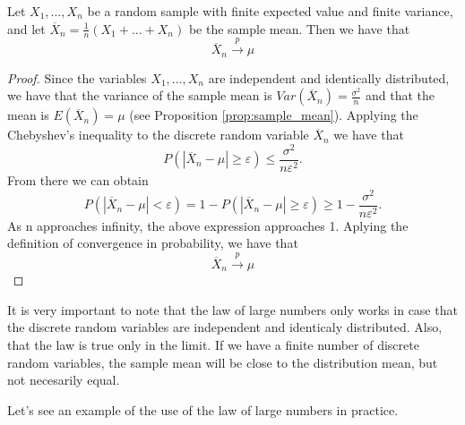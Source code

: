 \begin{theorem}
\label{th:law_large_numbers}
Let $X_1, \ldots, X_n$ be a random sample with finite expected value and finite variance, and let $\overline {X}_n = \frac {1}{n} \left( X_1 + \ldots + X_n \right)$ be the sample mean. Then we have that
\[
\overline {X}_n \overset{p}{\rightarrow} \mu
\]
\end{theorem}
\begin{proof}
Since the variables $X_1, \ldots, X_n$ are independent and identically distributed, we have that the variance of the sample mean is $Var \left( \overline {X}_n \right) = \frac{\sigma^2}{n}$ and that the mean is $E \left( \overline {X}_n \right) = \mu$ (see Proposition \ref{prop:sample_mean}). Applying the Chebyshev's inequality to the discrete random variable $\overline {X}_n$ we have that
\[
P \left( \left| \overline {X}_n- \mu \right| \geq \varepsilon \right) \leq \frac{\sigma ^2}{n \varepsilon^2}.
\]
From there we can obtain
\[
P \left( \left| \overline {X}_n - \mu \right| < \varepsilon \right) = 1 - P \left( \left| \overline {X}_n - \mu \right| \geq \varepsilon \right) \geq 1 - \frac{\sigma ^2}{n \varepsilon^2}.
\]
As n approaches infinity, the above expression approaches 1. Aplying the definition of convergence in probability, we have that
\[
\overline{X}_n \overset{p}{\rightarrow} \mu
\]
\end{proof}

It is very important to note that the law of large numbers only works in case that the discrete random variables are independent and identicaly distributed. Also, that the law is true only in the limit. If we have a finite number of discrete random variables, the sample mean will be close to the distribution mean, but not necesarily equal.

Let's see an example of the use of the law of large numbers in practice.

